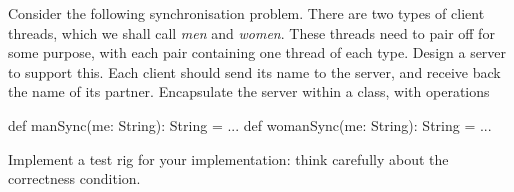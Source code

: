 \begin{question}
Consider the following synchronisation problem.  There are two
types of client threads, which we shall call \emph{men} and \emph{women}.
These threads need to pair off for some purpose, with each pair containing
one thread of each type.
%
Design a server  to support this.  Each client should send its name to
the server, and receive back the name of its partner.  Encapsulate the server
within a class, with operations
\begin{scala}
  def manSync(me: String): String = ...
  def womanSync(me: String): String = ...
\end{scala}

Implement a test rig for your implementation: think carefully about the
correctness condition. 
\end{question}


